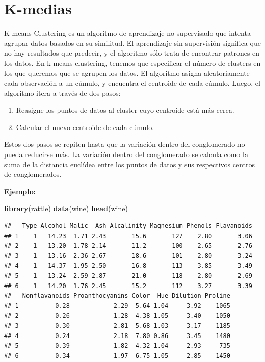 \documentclass[]{book}
\newenvironment{Shaded}{\begin{snugshade}}{\end{snugshade}}
\newcommand{\KeywordTok}[1]{\textcolor[rgb]{0.13,0.29,0.53}{\textbf{#1}}}
\newcommand{\NormalTok}[1]{#1}
\begin{document}
\section{K-medias}\label{k-medias}

K-means Clustering es un algoritmo de aprendizaje no supervisado que
intenta agrupar datos basados en su similitud. El aprendizaje sin
supervisión significa que no hay resultados que predecir, y el algoritmo
sólo trata de encontrar patrones en los datos. En k-means clustering,
tenemos que especificar el número de clusters en los que queremos que se
agrupen los datos. El algoritmo asigna aleatoriamente cada observación a
un cúmulo, y encuentra el centroide de cada cúmulo. Luego, el algoritmo
itera a través de dos pasos:

\begin{enumerate}
\def\labelenumi{\arabic{enumi}.}
\item
  Reasigne los puntos de datos al cluster cuyo centroide está más cerca.
\item
  Calcular el nuevo centroide de cada cúmulo.
\end{enumerate}

Estos dos pasos se repiten hasta que la variación dentro del
conglomerado no pueda reducirse más. La variación dentro del
conglomerado se calcula como la suma de la distancia euclídea entre los
puntos de datos y sus respectivos centros de conglomerados.

\textbf{Ejemplo:}

\begin{Shaded}
\begin{Highlighting}[]
\KeywordTok{library}\NormalTok{(rattle)}
\KeywordTok{data}\NormalTok{(wine)}
\KeywordTok{head}\NormalTok{(wine)}
\end{Highlighting}
\end{Shaded}

\begin{verbatim}
##   Type Alcohol Malic  Ash Alcalinity Magnesium Phenols Flavanoids
## 1    1   14.23  1.71 2.43       15.6       127    2.80       3.06
## 2    1   13.20  1.78 2.14       11.2       100    2.65       2.76
## 3    1   13.16  2.36 2.67       18.6       101    2.80       3.24
## 4    1   14.37  1.95 2.50       16.8       113    3.85       3.49
## 5    1   13.24  2.59 2.87       21.0       118    2.80       2.69
## 6    1   14.20  1.76 2.45       15.2       112    3.27       3.39
##   Nonflavanoids Proanthocyanins Color  Hue Dilution Proline
## 1          0.28            2.29  5.64 1.04     3.92    1065
## 2          0.26            1.28  4.38 1.05     3.40    1050
## 3          0.30            2.81  5.68 1.03     3.17    1185
## 4          0.24            2.18  7.80 0.86     3.45    1480
## 5          0.39            1.82  4.32 1.04     2.93     735
## 6          0.34            1.97  6.75 1.05     2.85    1450
\end{verbatim}
\end{document}
